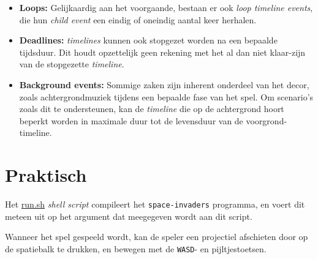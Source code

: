 \documentclass[10pt,a4paper]{article}
\begin{document}
\begin{itemize}
\begin{itemize}
\item \textbf{Loops:} Gelijkaardig aan het voorgaande, bestaan er ook
\emph{loop timeline events}, die hun \emph{child event} een eindig of
oneindig aantal keer herhalen.

\item \textbf{Deadlines:} \emph{timelines} kunnen ook stopgezet worden na
een bepaalde tijdsduur. Dit houdt opzettelijk geen rekening met het
al dan niet klaar-zijn van de stopgezette \emph{timeline}.

\item \textbf{Background events:} Sommige zaken zijn inherent onderdeel van
het decor, zoals achtergrondmuziek tijdens een bepaalde fase van het spel.
Om scenario's zoals dit te ondersteunen, kan de \emph{timeline} die op 
de achtergrond hoort beperkt worden in maximale duur tot de levensduur
van de voorgrond-timeline.

\end{itemize}

\end{itemize}

\section{Praktisch}

Het \url{run.sh} \emph{shell script} compileert het 
\texttt{space-invaders} programma, en
voert dit meteen uit op het argument dat meegegeven wordt aan dit
script.

Wanneer het spel gespeeld wordt, kan de speler een projectiel afschieten 
door op de spatiebalk te drukken, en bewegen met de \texttt{WASD}- en 
pijltjestoetsen.
\end{document}
